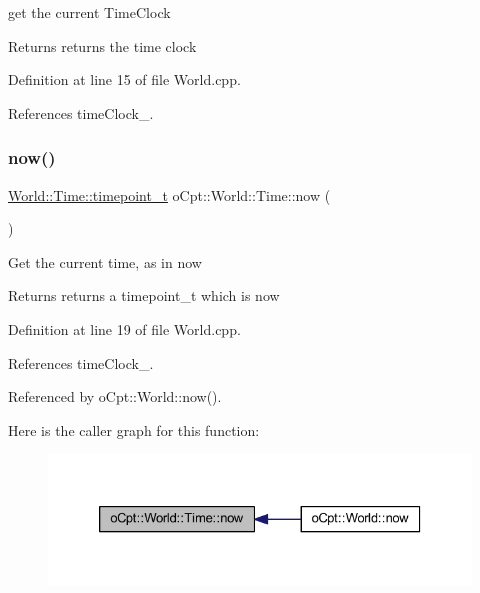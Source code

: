 get the current Time\+Clock \begin{DoxyReturn}{Returns}
returns the time clock 
\end{DoxyReturn}


Definition at line 15 of file World.\+cpp.



References time\+Clock\+\_\+.

\hypertarget{classo_cpt_1_1_world_1_1_time_a5f2069131e8ef21cb6e555fd633986fb}{}\label{classo_cpt_1_1_world_1_1_time_a5f2069131e8ef21cb6e555fd633986fb} 
\subsubsection{\texorpdfstring{now()}{now()}}
{\footnotesize\ttfamily \hyperlink{classo_cpt_1_1_world_1_1_time_a6a6e782c3c90622c1c7070b0a223ec4c}{World\+::\+Time\+::timepoint\+\_\+t} o\+Cpt\+::\+World\+::\+Time\+::now (\begin{DoxyParamCaption}{ }\end{DoxyParamCaption})}

Get the current time, as in now \begin{DoxyReturn}{Returns}
returns a timepoint\+\_\+t which is now 
\end{DoxyReturn}


Definition at line 19 of file World.\+cpp.



References time\+Clock\+\_\+.



Referenced by o\+Cpt\+::\+World\+::now().

Here is the caller graph for this function\+:\nopagebreak
\begin{figure}[H]
\begin{center}
\leavevmode
\includegraphics[width=326pt]{classo_cpt_1_1_world_1_1_time_a5f2069131e8ef21cb6e555fd633986fb_icgraph}
\end{center}
\end{figure}


